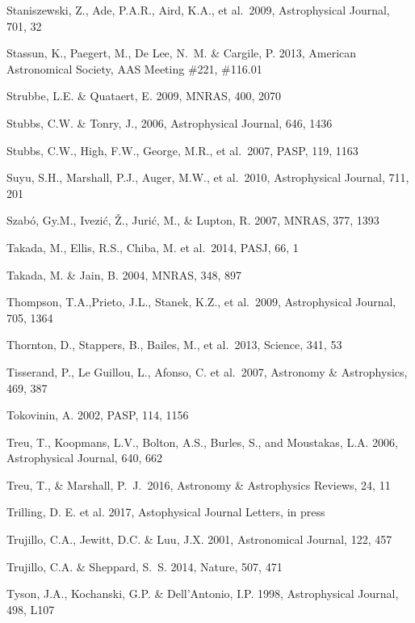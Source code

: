 \documentclass{emulateapj}
\begin{document}
\begin{thebibliography}{}

\bibitem[()]{} Staniszewski, Z., Ade, P.A.R., Aird, K.A., et al.~2009,  Astrophysical  Journal, 701, 32

\bibitem[()]{} Stassun, K., Paegert, M., De Lee, N.~M. \& Cargile, P. 2013, American Astronomical Society,
                      AAS Meeting \#221, \#116.01

\bibitem[()]{} Strubbe, L.E. \& Quataert, E. 2009, MNRAS, 400, 2070

\bibitem[()]{} Stubbs, C.W. \& Tonry, J., 2006, Astrophysical Journal, 646, 1436

\bibitem[()]{} Stubbs, C.W., High, F.W., George, M.R., et al.~2007, PASP, 119, 1163

\bibitem[()]{} Suyu, S.H., Marshall, P.J., Auger, M.W., et al.~2010, Astrophysical Journal, 711, 201

\bibitem[()]{} Szab\'o, Gy.M., Ivezi\'c, \v{Z}., Juri\'c, M., \& Lupton, R. 2007, MNRAS, 377, 1393

\bibitem[()]{} Takada, M., Ellis, R.S., Chiba, M. et al.~2014, PASJ,
  66, 1

\bibitem[()]{} Takada, M. \& Jain, B. 2004, MNRAS, 348, 897

\bibitem[()]{} Thompson, T.A.,Prieto, J.L., Stanek, K.Z., et al.~2009, Astrophysical Journal, 705, 1364

\bibitem[()]{} Thornton, D., Stappers, B., Bailes, M., et al.~2013, Science, 341, 53

\bibitem[()]{} Tisserand, P., Le Guillou, L., Afonso, C. et al.~2007, Astronomy \& Astrophysics, 469, 387

\bibitem[()]{} Tokovinin, A. 2002, PASP, 114, 1156

\bibitem[()]{} Treu, T., Koopmans, L.V., Bolton, A.S., Burles, S., and
  Moustakas, L.A. 2006, Astrophysical Journal, 640, 662

\bibitem[()]{} Treu, T., \& Marshall, P.~J.\ 2016, Astronomy \& Astrophysics Reviews, 24, 11

\bibitem[()]{} Trilling, D. E. et al.  2017, Astophysical Journal Letters, in press

\bibitem[()]{} Trujillo, C.A., Jewitt, D.C. \& Luu, J.X. 2001, Astronomical Journal, 122, 457

\bibitem[()]{} Trujillo, C.A. \& Sheppard, S.~S. 2014, Nature, 507, 471

\bibitem[()]{} Tyson, J.A., Kochanski, G.P. \& Dell'Antonio, I.P. 1998, Astrophysical Journal, 498, L107


\end{thebibliography}
\end{document}
